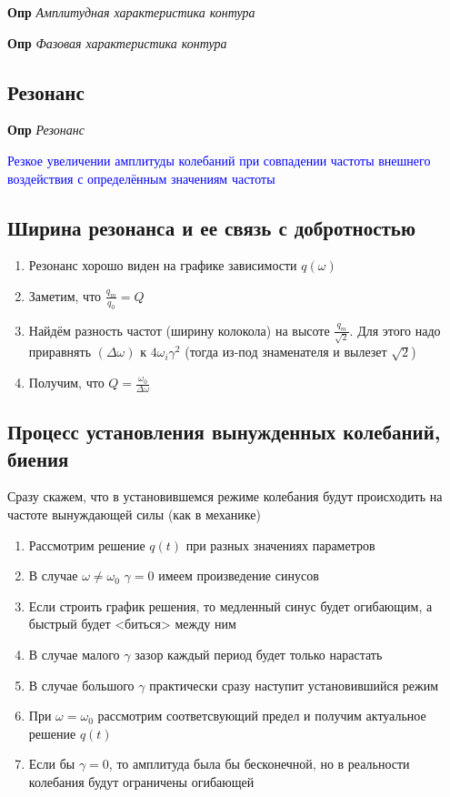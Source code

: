 \documentclass[a4paper, 14pt]{article}
\begin{document}
    \textbf{Опр} \textit{Амплитудная характеристика контура}
    
    \textbf{Опр} \textit{Фазовая характеристика контура}
    
    \subsection{Резонанс}
    
    \textbf{Опр} \textit{Резонанс}
    
    \textcolor{blue}{Резкое увеличении амплитуды колебаний при совпадении частоты внешнего воздействия с
    определённым значениям частоты}
    
    \subsection{Ширина резонанса и ее связь с добротностью}
    
    \begin{enumerate}
        \item Резонанс хорошо виден на графике зависимости $q(\omega)$
        \item Заметим, что $\frac{q_m}{q_0} = Q$
        \item Найдём разность частот (ширину колокола) на высоте $\frac{q_m}{\sqrt{2}}$.
        Для этого надо приравнять $(\Delta \omega)$ к $4 \omega_i \gamma^2$ (тогда из-под знаменателя и вылезет $\sqrt{2}$)
        \item Получим, что $Q = \frac{\omega_0}{\Delta \omega}$
    \end{enumerate}
    
    \subsection{Процесс установления вынужденных колебаний, биения}
    
    Сразу скажем, что в установившемся режиме колебания будут происходить на частоте вынуждающей силы (как в механике)
    
    \begin{enumerate}
        \item Рассмотрим решение $q(t)$ при разных значениях параметров
        \item В случае $\omega \neq \omega_0$ $\gamma = 0$ имеем произведение синусов
        \item Если строить график решения, то медленный синус будет огибающим, а быстрый будет <биться> между ним
        \item В случае малого $\gamma$ зазор каждый период будет только нарастать
        \item В случае большого $\gamma$ практически сразу наступит установившийся режим
        \item При $\omega = \omega_0$ рассмотрим соответсвующий предел и получим актуальное решение $q(t)$
        \item Если бы $\gamma = 0$, то амплитуда была бы бесконечной, но в реальности колебания будут ограничены
        огибающей
    \end{enumerate}
    
\end{document}
